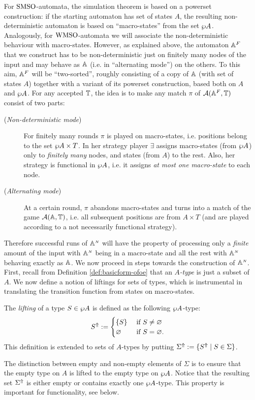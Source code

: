 For $\mathrm{SMSO}$-automata, the simulation theorem is based on a powerset construction:
if the starting automaton has set of states $A$, the resulting non-deterministic
automaton is based on ``macro-states'' from the set $\wp A$.
Analogously, for $\mathrm{WMSO}$-automata we will associate the non-deterministic
behaviour with macro-states.
However, as explained above, the automaton $\mathbb{A}^{F}$ that we construct has to
be non-deterministic just on finitely many nodes of the input and may behave as
$\mathbb{A}$ (i.e. in ``alternating mode'') on the others.
To this aim, $\mathbb{A}^{F}$ will be ``two-sorted'', roughly consisting of a copy of
$\mathbb{A}$ (with set of states $A$) together with a variant of its powerset construction,
based both on $A$ and $\wp A$.
For any accepted $\mathbb{T}$, the idea is to make any match $\pi$ of
$\mathcal{A}(\mathbb{A}^{F},\mathbb{T})$ consist of two parts:
\begin{description}
\item[(\textit{Non-deterministic mode})] For finitely many rounds $\pi$ is
  played on macro-states, i.e. positions belong to the set $\wp A \times T$.
  In her strategy player $\exists$ assigns macro-states (from $\wp A$) only to
  \emph{finitely many} nodes, and states (from $A$) to the rest.
  Also, her strategy is functional in $\wp A$, i.e. it assigns \emph{at most one
  macro-state} to each node.
\item[(\textit{Alternating mode})] At a certain round, $\pi$ abandons
  macro-states and turns into a match of the game $\mathcal{A}(\mathbb{A},\mathbb{T})$, i.e. all
  subsequent positions are from $A \times T$ (and are played according to a
  not necessarily functional strategy).
\end{description}
Therefore successful runs of $\mathbb{A}^{{\scriptscriptstyle N}}$ will have the property of processing 
only a \emph{finite} amount of the input with $\mathbb{A}^{{\scriptscriptstyle N}}$ being in a 
macro-state and all the rest with $\mathbb{A}^{{\scriptscriptstyle N}}$ behaving exactly as $\mathbb{A}$.
We now proceed in steps towards the construction of $\mathbb{A}^{{\scriptscriptstyle N}}$. 
First, recall from Definition \ref{def:basicform-ofoe} that an \emph{$A$-type}
is just a subset of $A$. 
We now define a notion of liftings for sets of types, which is instrumental in
translating the transition function from states on macro-states.

\begin{definition}
The \emph{lifting} of a type $S \in \wp A$ is defined as the following
$\wp A$-type:
\[
S^{\Uparrow} \mathrel{:=} 
\begin{cases} \{ S \} & \text{ if } S \neq \varnothing \\
\varnothing & \text{ if } S = \varnothing.
\end{cases}
\]
This definition is extended to sets of $A$-types by putting $\Sigma^{\Uparrow} 
\mathrel{:=} \{ S^{\Uparrow} \mid S \in \Sigma \}$.
\end{definition}
The distinction between empty and non-empty elements of $\Sigma$ is to ensure 
that the empty type on $A$ is lifted to the empty type on $\wp A$. 
Notice that the resulting set $\Sigma^{\Uparrow}$ is either empty or 
contains exactly one $\wp A$-type.
This property is important for functionality, see below.

